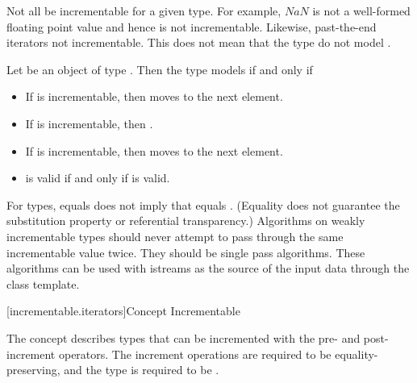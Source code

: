 \begin{addedblock}
\pnum
Not all  be incrementable for a given type.
\enternote For example, $NaN$ is not a well-formed floating point value and hence is
not incrementable. Likewise, past-the-end iterators  not
 incrementable. This does not mean that the type
do not model . \exitnote

\pnum
Let  be an object of type .
Then the type  models  if and only if

\begin{itemize}
\item If  is incrementable, then  moves  to the next element.
\item If  is incrementable, then .
\item If  is incrementable, then  moves  to the next element.
\item {} is valid if and only if  is valid.
\end{itemize}



\pnum
\enternote For  types,  equals  does not imply that 
equals . (Equality does not guarantee the substitution property or referential
transparency.) Algorithms on weakly incrementable types should never attempt to pass
through the same incrementable value twice. They should be single pass algorithms. These algorithms
can be used with istreams as the source of the input data through the  class
template.\exitnote

[incrementable.iterators]{Concept Incrementable}

The  concept describes types that can be incremented with the pre-
and post-increment operators. The increment operations are required to be equality-preserving,
and the type is required to be . 


\end{addedblock}
